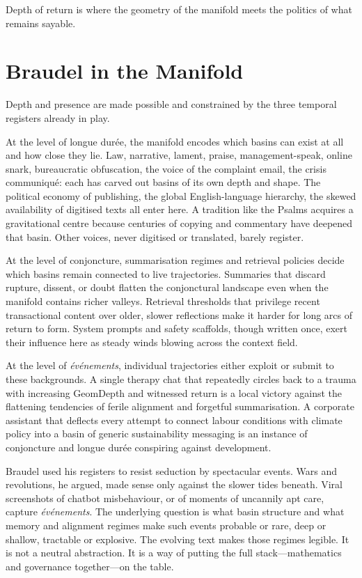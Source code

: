 \documentclass[12pt,a4paper]{article}
\begin{document}
Depth of return is where the geometry of the manifold meets the politics of what remains sayable.

\section{Braudel in the Manifold}

Depth and presence are made possible and constrained by the three temporal registers already in play.

At the level of longue durée, the manifold encodes which basins can exist at all and how close they lie. Law, narrative, lament, praise, management-speak, online snark, bureaucratic obfuscation, the voice of the complaint email, the crisis communiqué: each has carved out basins of its own depth and shape. The political economy of publishing, the global English-language hierarchy, the skewed availability of digitised texts all enter here. A tradition like the Psalms acquires a gravitational centre because centuries of copying and commentary have deepened that basin. Other voices, never digitised or translated, barely register.

At the level of conjoncture, summarisation regimes and retrieval policies decide which basins remain connected to live trajectories. Summaries that discard rupture, dissent, or doubt flatten the conjonctural landscape even when the manifold contains richer valleys. Retrieval thresholds that privilege recent transactional content over older, slower reflections make it harder for long arcs of return to form. System prompts and safety scaffolds, though written once, exert their influence here as steady winds blowing across the context field.

At the level of \emph{événements}, individual trajectories either exploit or submit to these backgrounds. A single therapy chat that repeatedly circles back to a trauma with increasing GeomDepth and witnessed return is a local victory against the flattening tendencies of ferile alignment and forgetful summarisation. A corporate assistant that deflects every attempt to connect labour conditions with climate policy into a basin of generic sustainability messaging is an instance of conjoncture and longue durée conspiring against development.

Braudel used his registers to resist seduction by spectacular events. Wars and revolutions, he argued, made sense only against the slower tides beneath. Viral screenshots of chatbot misbehaviour, or of moments of uncannily apt care, capture \emph{événements}. The underlying question is what basin structure and what memory and alignment regimes make such events probable or rare, deep or shallow, tractable or explosive. The evolving text makes those regimes legible. It is not a neutral abstraction. It is a way of putting the full stack---mathematics and governance together---on the table.
\end{document}
